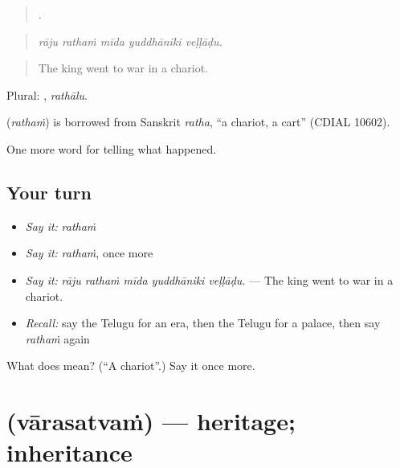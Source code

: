 \begin{quote}
    .
\end{quote}

\begin{quote}
\emph{rāju rathaṁ mīda yuddhāniki veḷḷāḍu.}
\end{quote}

\begin{quote}
The king went to war in a chariot.
\end{quote}

Plural: , \emph{rathālu}.

\begin{cousinweb}
\textbf{} (\emph{rathaṁ}) is borrowed from Sanskrit \emph{ratha}, \textquotedblleft{}a chariot, a cart\textquotedblright{} (CDIAL 10602).
\end{cousinweb}

\begin{grammarlens}[title={What you've built}]
One more word for telling what happened.
\end{grammarlens}

\subsection*{Your turn}
\begin{itemize}
\raggedright
  \item \emph{Say it:} \emph{rathaṁ}
  \item \emph{Say it:} \emph{rathaṁ}, once more
  \item \emph{Say it:} \emph{rāju rathaṁ mīda yuddhāniki veḷḷāḍu.} — The king went to war in a chariot.
  \item \emph{Recall:} say the Telugu for an era, then the Telugu for a palace, then say \emph{rathaṁ} again
\end{itemize}

\begin{tcolorbox}[breakable,colback=teal!4,colframe=teal!35!black,title={Before you move on}]
What does  mean? (\textquotedblleft{}A chariot\textquotedblright{}.) Say it once more.
\end{tcolorbox}
\section[\texorpdfstring{\te{వారసత్వం} (vārasatvaṁ)}{వారసత్వం (vārasatvaṁ)}]{ (vārasatvaṁ) — heritage; inheritance}

